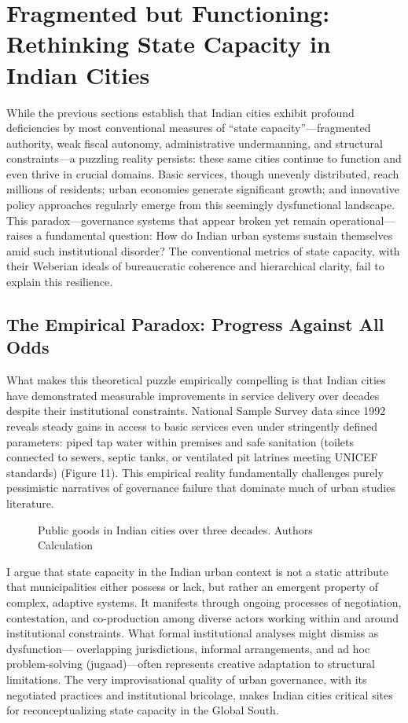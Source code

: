 \section{Fragmented but Functioning: Rethinking State Capacity in Indian Cities}

While the previous sections establish that Indian cities exhibit profound deficiencies by most conventional measures of ``state capacity''—fragmented authority, weak fiscal autonomy, administrative undermanning, and structural constraints—a puzzling reality persists: these same cities continue to function and even thrive in crucial domains. Basic services, though unevenly distributed, reach millions of residents; urban economies generate significant growth; and innovative policy approaches regularly emerge from this seemingly dysfunctional landscape. This paradox—governance systems that appear broken yet remain operational—raises a fundamental question: How do Indian urban systems sustain themselves amid such institutional disorder? The conventional metrics of state capacity, with their Weberian ideals of bureaucratic coherence and hierarchical clarity, fail to explain this resilience.

\subsection{The Empirical Paradox: Progress Against All Odds}

What makes this theoretical puzzle empirically compelling is that Indian cities have demonstrated measurable improvements in service delivery over decades despite their institutional constraints. National Sample Survey data since 1992 reveals steady gains in access to basic services even under stringently defined parameters: piped tap water within premises and safe sanitation (toilets connected to sewers, septic tanks, or ventilated pit latrines meeting UNICEF standards) (Figure 11). This empirical reality fundamentally challenges purely pessimistic narratives of governance failure that dominate much of urban studies literature.

\begin{figure}[htbp]
\centering
\caption{Public goods in Indian cities over three decades. Authors Calculation}
\label{fig:public_goods}
\end{figure}

I argue that state capacity in the Indian urban context is not a static attribute that municipalities either possess or lack, but rather an emergent property of complex, adaptive systems. It manifests through ongoing processes of negotiation, contestation, and co-production among diverse actors working within and around institutional constraints. What formal institutional analyses might dismiss as dysfunction— overlapping jurisdictions, informal arrangements, and ad hoc problem-solving (jugaad)—often represents creative adaptation to structural limitations. The very improvisational quality of urban governance, with its negotiated practices and institutional bricolage, makes Indian cities critical sites for reconceptualizing state capacity in the Global South.

